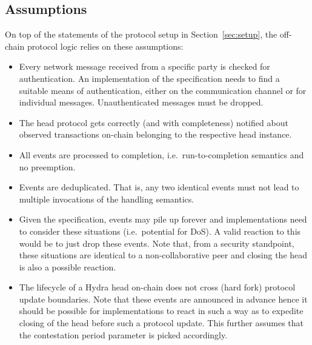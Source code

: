\subsection{Assumptions}

On top of the statements of the protocol setup in Section~\ref{sec:setup}, the
off-chain protocol logic relies on these assumptions:
\begin{itemize}
	\item Every network message received from a specific party is checked for
	      authentication. An implementation of the specification needs to find a
	      suitable means of authentication, either on the communication channel
        or for individual messages. Unauthenticated messages must be dropped.
	\item The head protocol gets correctly (and with completeness) notified about
	      observed transactions on-chain belonging to the respective head
	      instance.
	\item All events are processed to completion, i.e.\ run-to-completion semantics
	      and no preemption.
	\item Events are deduplicated. That is, any two identical events must not lead
	      to multiple invocations of the handling semantics.
	\item Given the specification, events may pile up forever and implementations
	      need to consider these situations (i.e.\ potential for DoS). A valid reaction
        to this would be to just drop these events. Note that, from a security standpoint,
        these situations are identical to a non-collaborative peer and closing the head
        is also a possible reaction.
	\item The lifecycle of a Hydra head on-chain does not cross (hard fork)
	      protocol update boundaries. Note that these events are announced in
	      advance hence it should be possible for implementations to react in such
	      a way as to expedite closing of the head before such a protocol update.
	      This further assumes that the contestation period parameter is picked
	      accordingly.
\end{itemize}


